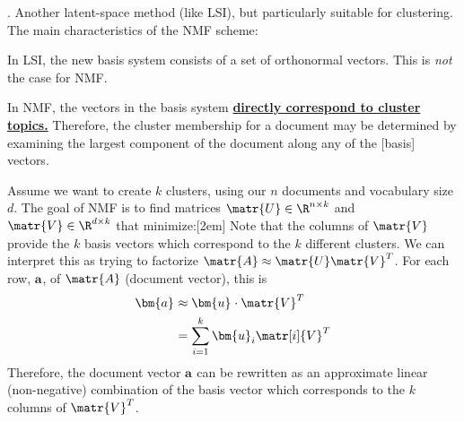 \documentclass[11pt]{article}
\renewcommand\vec[2][]{\bm{#2}_{#1}}
\newcommand\myspace[1][]{\vspace{#1\bigskipamount}}
\newcommand\p{\Needspace{10\baselineskip} \noindent}
\begin{document}
\myspace
\p {}. Another latent-space method (like LSI), but particularly suitable for clustering. The main characteristics of the NMF scheme:
\begin{compactitem}
	\item In LSI, the new basis system consists of a set of orthonormal vectors. This is \textit{not} the case for NMF.
	
	\item In NMF, the vectors in the basis system \textbf{\underline{directly correspond to cluster topics.}} Therefore, the cluster membership for a document may be determined by examining the largest component of the document along any of the [basis] vectors.
\end{compactitem}
\p Assume we want to create $k$ clusters, using our $n$ documents and vocabulary size $d$. The goal of NMF is to find matrices $\matr{U} \in \R^{n \times k}$ and $\matr{V} \in \R^{d \times k}$ that minimize:[2em]
Note that the columns of $\matr{V}$ provide the $k$ basis vectors which correspond to the $k$ different clusters. We can interpret this as trying to factorize $\matr{A} \approx \matr{U} \matr{V}^T$. For each row, $\vec{a}$, of $\matr{A}$ (document vector), this is 
\begin{align}
	\vec{a} &\approx \vec{u} \cdot \matr{V}^T \\
	&= \sum_{i = 1}^{k} \vec[i]{u} \matr[i]{V}^T
\end{align}
Therefore, the document vector $\vec{a}$ can be rewritten as an approximate linear (non-negative) combination of the basis vector which corresponds to the $k$ columns of $\matr{V}^T$. \\
\end{document}
